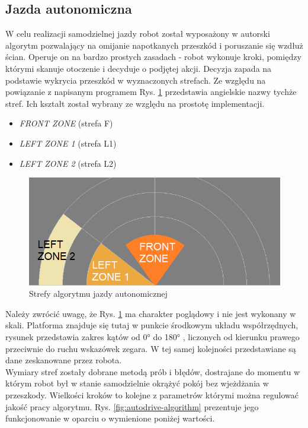\subsection{Jazda autonomiczna}
W celu realizacji samodzielnej jazdy robot został wyposażony w autorski algorytm pozwalający na omijanie napotkanych przeszkód i poruszanie się wzdłuż ścian. Operuje on na bardzo prostych zasadach - robot wykonuje kroki, pomiędzy którymi skanuje otoczenie i decyduje o podjętej akcji. Decyzja zapada na podstawie wykrycia przeszkód w wyznaczonych strefach. Ze względu na powiązanie z napisanym programem Rys. \ref{fig:autodrive-zones} przedstawia angielskie nazwy tychże stref. Ich kształt został wybrany ze względu na prostotę implementacji.
\begin{itemize}
    \item \emph{FRONT ZONE} (strefa F)
    \item \emph{LEFT ZONE 1} (strefa L1)
    \item \emph{LEFT ZONE 2} (strefa L2)
\end{itemize}

\begin{figure}[ht]
	\centering
		\includegraphics[width=1\linewidth]{rys/autodrive-zones.png}
	\caption{Strefy algorytmu jazdy autonomicznej}
	\label{fig:autodrive-zones}
\end{figure}

Należy zwrócić uwagę, że  Rys. \ref{fig:autodrive-zones} ma charakter poglądowy i nie jest wykonany w skali. Platforma znajduje się tutaj w punkcie środkowym układu współrzędnych, rysunek przedstawia zakres kątów od 0° do 180° , liczonych od kierunku prawego przeciwnie do ruchu wskazówek zegara. W tej samej kolejności przedstawiane są dane zeskanowane przez robota.
\\
Wymiary stref zostały dobrane metodą prób i błędów, dostrajane do momentu w którym robot był w stanie samodzielnie okrążyć pokój bez wjeżdżania w przeszkody.
Wielkości kroków to kolejne z parametrów którymi można regulować jakość pracy algorytmu. Rys. \ref{fig:autodrive-algorithm} prezentuje jego funkcjonowanie w oparciu o wymienione poniżej wartości.

